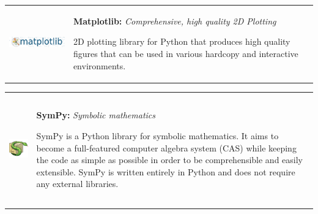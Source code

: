     \begin{center}
    \begin{tabularx}{\textwidth}{rX}
        \begin{minipage}{0.25\columnwidth}
            \begin{center}
            \includegraphics[width=6cm]{./images/matplotlib_med.png}
            \end{center}
        \end{minipage}
        &
        \begin{minipage}{0.7\columnwidth}
            \textbf{Matplotlib:} \textit{Comprehensive, high quality 2D Plotting}
            \vspace{0.5ex}

            \footnotesize{2D plotting library for Python that produces high
                quality figures that can be used in various hardcopy and
                interactive environments.}
        \end{minipage}
    \end{tabularx}
    \end{center}

\vspace{1ex}
\noindent\hrulefill
\vspace{1ex}

    \begin{center}
    \begin{tabularx}{\textwidth}{rX}
        \begin{minipage}{0.25\columnwidth}
            \begin{center}
            \includegraphics[height=4cm]{./images/sympy_logo.png}
            \end{center}
        \end{minipage}
        &
        \begin{minipage}{0.7\columnwidth}
            \textbf{SymPy:} \textit{Symbolic mathematics}
            \vspace{0.5ex}

            \footnotesize{SymPy is a Python library for symbolic mathematics.
                It aims to become a full-featured computer algebra system (CAS)
                while keeping the code as simple as possible in order to be
                comprehensible and easily extensible. SymPy is written entirely
                in Python and does not require any external libraries.}
        \end{minipage}
    \end{tabularx}
    \end{center}

